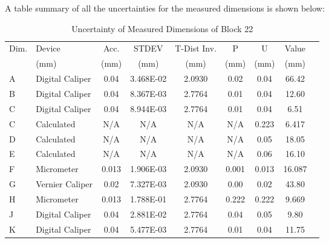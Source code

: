 \noindent A table summary of all the uncertainties for the measured dimensions is shown below:
\begin{table}[h]
    \centering
    \caption{Uncertainty of Measured Dimensions of Block 22}
    \label{tab:uncertainty-measured-dimensions-block-22}
    \begin{tabular}{llccccccc}
        \toprule
        Dim. & Device          & Acc.               & STDEV     & T-Dist Inv.& P             & U     & Value   \\
             & (mm)            & (mm)               & (mm)      & (mm)           & (mm)  & (mm)  & (mm)    \\
        \midrule
        A    & Digital Caliper & 0.04               & 3.468E-02 & 2.0930         & 0.02  & 0.04  & 66.42   \\
        B    & Digital Caliper & 0.04               & 8.367E-03 & 2.7764         & 0.01  & 0.04  & 12.60   \\
        C    & Digital Caliper & 0.04               & 8.944E-03 & 2.7764         & 0.01  & 0.04  & 6.51    \\
        C    & Calculated      & N/A                & N/A       & N/A            & N/A   & 0.223 & 6.417   \\
        D    & Calculated      & N/A                & N/A       & N/A            & N/A   & 0.05  & 18.05   \\
        E    & Calculated      & N/A                & N/A       & N/A            & N/A   & 0.06  & 16.10   \\
        F    & Micrometer      & 0.013              & 1.906E-03 & 2.0930         & 0.001 & 0.013 & 16.087  \\
        G    & Vernier Caliper & 0.02               & 7.327E-03 & 2.0930         & 0.00  & 0.02  & 43.80   \\
        H    & Micrometer      & 0.013              & 1.788E-01 & 2.7764         & 0.222 & 0.222 & 9.669   \\
        J    & Digital Caliper & 0.04               & 2.881E-02 & 2.7764         & 0.04  & 0.05  & 9.80    \\
        K    & Digital Caliper & 0.04               & 5.477E-03 & 2.7764         & 0.01  & 0.04  & 11.75   \\
        \bottomrule
    \end{tabular}
\end{table}


